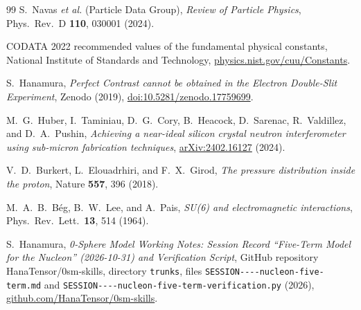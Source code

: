 \documentclass[%
 reprint, amsmath,amssymb, aps, prb, ]{revtex4-2}
\numberwithin{equation}{section}
\begin{document}
\begin{thebibliography}{99}
S.~Navas \emph{et al.} (Particle Data Group),
\emph{Review of Particle Physics},
Phys.~Rev.~D \textbf{110}, 030001 (2024).

CODATA 2022 recommended values of the fundamental physical constants, National Institute of Standards and Technology, \href{https://physics.nist.gov/cuu/Constants/}{physics.nist.gov/cuu/Constants}.

S.~Hanamura,
\emph{Perfect Contrast cannot be obtained in the Electron Double-Slit Experiment},
Zenodo (2019), \href{https://doi.org/10.5281/zenodo.17759699}{doi:10.5281/zenodo.17759699}.

M.~G.~Huber, I.~Taminiau, D.~G.~Cory, B.~Heacock, D.~Sarenac, R.~Valdillez, and D.~A.~Pushin,
\emph{Achieving a near-ideal silicon crystal neutron interferometer using sub-micron fabrication techniques},
\href{https://arxiv.org/abs/2402.16127}{arXiv:2402.16127} (2024).

V.~D.~Burkert, L.~Elouadrhiri, and F.~X.~Girod,
\emph{The pressure distribution inside the proton},
Nature \textbf{557}, 396 (2018).

M.~A.~B.~B\'eg, B.~W.~Lee, and A.~Pais,
\emph{SU(6) and electromagnetic interactions},
Phys.~Rev.~Lett.~\textbf{13}, 514 (1964).

S.~Hanamura,
\emph{0-Sphere Model Working Notes: Session Record ``Five-Term Model for the Nucleon'' (2026-10-31) and Verification Script},
GitHub repository HanaTensor/0sm-skills, directory \texttt{trunks}, files \texttt{SESSION----\allowbreak nucleon-\allowbreak five-\allowbreak term.md} and \texttt{SESSION----\allowbreak nucleon-\allowbreak five-\allowbreak term-\allowbreak verification.py} (2026), \href{https://github.com/HanaTensor/0sm-skills}{github.com/HanaTensor/0sm-skills}.

\end{thebibliography}
\end{document}
